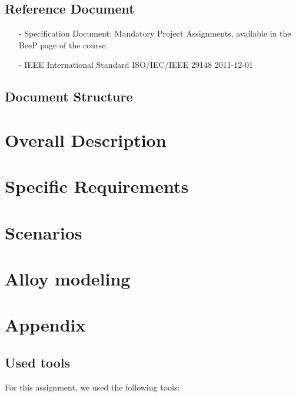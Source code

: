 \documentclass[12pt, a4paper]{article}
\begin{document}
		\subsection{Reference Document}
			\begin{itemize}
				\item[-] \textsf{Specification Document: Mandatory Project Assignments}, available in the BeeP page of the course.
				\item[-] \textsf{IEEE International Standard ISO/IEC/IEEE 29148 2011-12-01}
			\end{itemize}
		
		\subsection{Document Structure}	
			
		


	\newpage
	\section{Overall Description}
		


	\newpage
	\section{Specific Requirements}
		

	\newpage
	\section{Scenarios}
		


	\newpage
	\section{Alloy modeling}
		


	\newpage	
	\section{Appendix}
		\listoffigures
		\listoftables
		
		\subsection{Used tools}
		For this assignment, we used the following tools:
		
\end{document}
